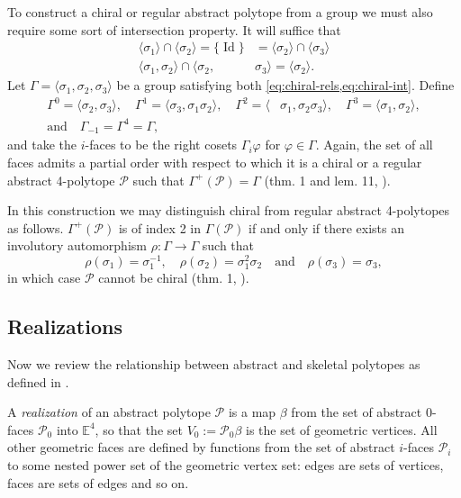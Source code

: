 \documentclass{article}
\theoremstyle{definition}
\newcommand{\E}{\mathbb{E}}
\newcommand{\p}{\mathcal{P}}
\DeclareMathOperator{\Id}{Id}
\begin{document}
	To construct a chiral or regular abstract polytope from a group we must also require some sort of intersection property. It will suffice that
	\begin{equation}\label{eq:chiral-int}
		\begin{aligned}
			\langle\sigma_1\rangle\cap\langle\sigma_2\rangle=\{\Id\}&=\langle\sigma_2\rangle\cap\langle\sigma_3\rangle\\
			\langle\sigma_1,\sigma_2\rangle\cap\langle\sigma_2,&\sigma_3\rangle=\langle\sigma_2\rangle.
		\end{aligned}
	\end{equation}
	Let $\Gamma=\langle \sigma_1,\sigma_2,\sigma_3\rangle$ be a group satisfying both \cref{eq:chiral-rels,eq:chiral-int}. Define
	\begin{align*}
		\Gamma^0=\langle\sigma_2,\sigma_3\rangle,\quad
		\Gamma^1=\langle \sigma_3,\sigma_1\sigma_2\rangle,\quad
		\Gamma^2=\langle &\sigma_1,\sigma_2\sigma_3\rangle,\quad
		\Gamma^3=\langle \sigma_1,\sigma_2\rangle,\\
		\text{and}\quad\Gamma_{-1}=\Gamma^4=\Gamma,
	\end{align*}
	and take the $i$-faces to be the right cosets $\Gamma_i\varphi$ for $\varphi\in\Gamma$. Again, the set of all faces admits a partial order with respect to which it is a chiral or a regular abstract 4-polytope $\p$ such that $\Gamma^+(\p)=\Gamma$ (thm. 1 and lem. 11, \cite{schulte-chiral}).
	
	In this construction we may distinguish chiral from regular abstract 4-polytopes as follows. $\Gamma^+(\p)$ is of index 2 in $\Gamma(\p)$ if and only if there exists an involutory automorphism $\rho:\Gamma\to \Gamma$ such that
	\begin{equation}\label{eq:combinatorially-chiral}
		\rho(\sigma_1)=\sigma_1^{-1},\quad \rho(\sigma_2)=\sigma_1^2\sigma_2\quad\text{and}\quad \rho(\sigma_3)=\sigma_3,
\end{equation}
	in which case $\p$ cannot be chiral (thm. 1, \cite{schulte-chiral}).

\vspace{10pt}

	\subsection{Realizations}\label{subsec:realizations}
	Now we review the relationship between abstract and skeletal polytopes as defined in .
	
	A \textit{realization} of an abstract polytope $\p$ is a map $\beta$ from the set of abstract 0-faces $\p_0$ into $\E^4$, so that the set $V_0:=\p_0\beta$ is the set of geometric vertices. All other geometric faces are defined by functions from the set of abstract $i$-faces $\p_i$ to some nested power set of the geometric vertex set: edges are sets of vertices, faces are sets of edges and so on.
	
\end{document}
